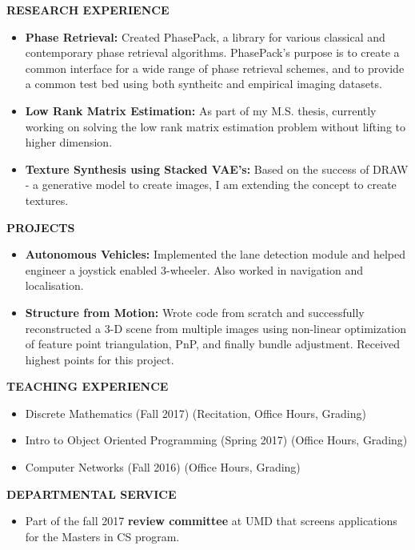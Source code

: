 \documentclass[a4paper,8pt]{article}
\newcommand{\resheading}[1]{\begin{tcolorbox} \begin{center} #1 \end{center} \end{tcolorbox}}
\begin{document}
\resheading{\textbf{RESEARCH EXPERIENCE} }
\begin{itemize}[noitemsep]
\item\textbf{Phase Retrieval:} Created PhasePack, a library for various classical and contemporary phase retrieval algorithms. PhasePack's purpose is to create a common interface for a wide range of phase retrieval schemes, and to provide a common test bed using both syntheitc and empirical imaging datasets.

\item \textbf{Low Rank Matrix Estimation:} As part of my M.S. thesis, currently working on solving the low rank matrix estimation problem without lifting to higher dimension.

\item \textbf{Texture Synthesis using Stacked VAE's:} Based on the success of DRAW - a generative model to create images, I am extending the concept to create textures.
\end{itemize}


\resheading{\textbf{PROJECTS} }
\begin{itemize}[noitemsep]
\item\textbf{Autonomous Vehicles:} Implemented the lane detection module and helped engineer a joystick enabled 3-wheeler. Also worked in navigation and localisation. 

\item \textbf{Structure from Motion:} Wrote code from scratch and successfully reconstructed a 3-D scene from multiple images using non-linear optimization of feature point triangulation, PnP, and finally bundle adjustment. Received highest points for this project.
\end{itemize}




\resheading{\textbf{TEACHING EXPERIENCE} }
\begin{itemize}[noitemsep]
\item \noindent Discrete Mathematics (Fall 2017) (Recitation, Office Hours, Grading)
\item \noindent Intro to Object Oriented Programming (Spring 2017) (Office Hours, Grading)
\item \noindent Computer Networks (Fall 2016) (Office Hours, Grading)
\end{itemize}


\resheading{\textbf{DEPARTMENTAL SERVICE} }
\begin{itemize}
\item \noindent Part of the fall 2017 \textbf{review committee} at UMD that screens applications for the Masters in CS program.
\end{itemize}
\end{document}
